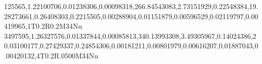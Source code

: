 125565,1.22100706,0.01238306,0.00098318,266.84543083,2.73151929,0.22548384,19.28273661,0.26408303,0.2215505,0.00288904,0.01151879,0.00596529,0.02119797,0.00419965,1T0.2R0.2M34Nu
3497595,1.26327576,0.01337844,0.00085813,340.13993308,3.49305967,0.14024386,20.03100177,0.27429337,0.24854306,0.00181211,0.00801979,0.00616207,0.01887043,0.00420132,4T0.2R.0500M34Nu
